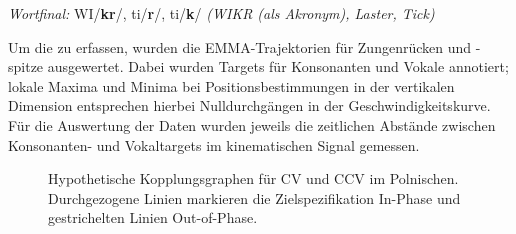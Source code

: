 {%
\begin{exe}
	\label{ex:0312}
	\ex \textit{Wortfinal:} WI/\textbf{kr}/, ti/\textbf{r}/, ti/\textbf{k}/
	\sn \textit{(WIKR (als Akronym), Laster, Tick)}
\end{exe}

Um die  zu erfassen, wurden die EMMA-Trajektorien für Zungenrücken und -spitze ausgewertet. Dabei wurden Targets für Konsonanten und Vokale annotiert; lokale Maxima und Minima bei Positionsbestimmungen in der vertikalen Dimension entsprechen hierbei Nulldurchgängen in der Geschwindigkeitskurve. Für die Auswertung der Daten wurden jeweils die zeitlichen Abstände zwischen Konsonanten- und Vokaltargets im kinematischen Signal gemessen. 

\begin{figure}[b]

	\caption{Hypothetische Kopplungsgraphen für CV und CCV im  {Polnisch}en. Durchgezogene Linien markieren die Zielspezifikation In-Phase und gestrichelten Linien Out-of-Phase.}
	\label{figure:0308}
\end{figure}

}
